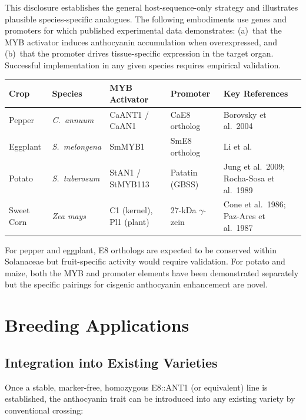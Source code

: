 \documentclass[12pt,a4paper]{article}
\begin{document}
This disclosure establishes the general host-sequence-only strategy and illustrates plausible species-specific analogues. The following embodiments use genes and promoters for which published experimental data demonstrates: (a)~that the MYB activator induces anthocyanin accumulation when overexpressed, and (b)~that the promoter drives tissue-specific expression in the target organ. Successful implementation in any given species requires empirical validation.

\begin{longtable}{p{1.5cm} p{2.5cm} p{2.5cm} p{2.5cm} p{4cm}}
\toprule
\textbf{Crop} & \textbf{Species} & \textbf{MYB Activator} & \textbf{Promoter} & \textbf{Key References} \\
\midrule
\endhead
Pepper & \textit{C.~annuum} & CaANT1 / CaAN1 & CaE8 ortholog & Borovsky et al.\ 2004 \\
\addlinespace
Eggplant & \textit{S.~melongena} & SmMYB1 & SmE8 ortholog & Li et al. \\
\addlinespace
Potato & \textit{S.~tuberosum} & StAN1 / StMYB113 & Patatin (GBSS) & Jung et al.\ 2009; Rocha-Sosa et al.\ 1989 \\
\addlinespace
Sweet Corn & \textit{Zea mays} & C1 (kernel), Pl1 (plant) & 27-kDa $\gamma$-zein & Cone et al.\ 1986; Paz-Ares et al.\ 1987 \\
\bottomrule
\end{longtable}

\noindent For pepper and eggplant, E8 orthologs are expected to be conserved within Solanaceae but fruit-specific activity would require validation. For potato and maize, both the MYB and promoter elements have been demonstrated separately but the specific pairings for cisgenic anthocyanin enhancement are novel.

\section{Breeding Applications}

\subsection{Integration into Existing Varieties}

Once a stable, marker-free, homozygous E8::ANT1 (or equivalent) line is established, the anthocyanin trait can be introduced into any existing variety by conventional crossing:
\end{document}
